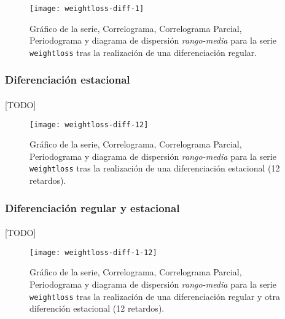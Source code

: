 \documentclass[a4paper, spanish]{article}
\begin{document}
        \begin{figure}[htb!]
          \texttt{[image: weightloss-diff-1]}
          \caption{Gráfico de la serie, Correlograma, Correlograma Parcial, Periodograma y diagrama de dispersión \emph{rango-media} para la serie \texttt{weightloss} tras la realización de una diferenciación regular.}
          \label{img:weightloss_diff_1}
        \end{figure}

      \subsubsection{Diferenciación estacional}


        \paragraph{}
        [TODO]

        \begin{figure}[htb!]
          \texttt{[image: weightloss-diff-12]}
          \caption{Gráfico de la serie, Correlograma, Correlograma Parcial, Periodograma y diagrama de dispersión \emph{rango-media} para la serie \texttt{weightloss} tras la realización de una diferenciación estacional (12 retardos).}
          \label{img:weightloss_diff_12}
        \end{figure}

      \subsubsection{Diferenciación regular y estacional}

        \paragraph{}
        [TODO]

        \begin{figure}[htb!]
          \texttt{[image: weightloss-diff-1-12]}
          \caption{Gráfico de la serie, Correlograma, Correlograma Parcial, Periodograma y diagrama de dispersión \emph{rango-media} para la serie \texttt{weightloss} tras la realización de una diferenciación regular y otra diferención estacional (12 retardos).}
          \label{img:weightloss_diff_1_12}
        \end{figure}
\end{document}
